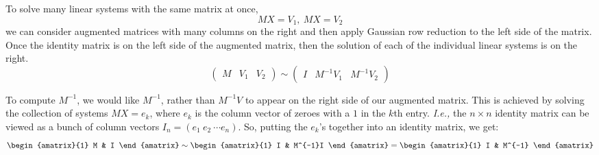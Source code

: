 To solve many linear systems with the same matrix at once, 
$$MX=V_1,~MX=V_2$$
we can consider augmented matrices with 
many columns on the right 
 and then apply Gaussian row reduction to the left side of the matrix.  Once the identity matrix is on the left side of the augmented matrix, then the solution of each of the individual linear systems is on the right.
 \[
\left(\begin{array}{c|cc}
\!M & V_1&V_2\!
\end{array}\right)
\sim
\left(\begin{array}{c|cc}
\!I & M^{-1}V_1 & M^{-1}V_2\!
\end{array}\right)
\]


To compute $M^{-1}$, we would like $M^{-1}$, rather than $M^{-1}V$ to appear on the right side of our augmented matrix.
This is achieved by  solving the collection of systems $MX=e_k$, where $e_k$ is the column vector of zeroes with a $1$ in the $k$th entry.  
{\it I.e.,} the $n\times n$ identity matrix can be viewed as a bunch of column vectors $I_n=(e_1 \ e_2 \ \cdots e_n)$. So, putting the $e_k$'s together into an identity matrix, we get:
\[
\begin{amatrix}{1}
M & I
\end{amatrix}
\sim
\begin{amatrix}{1}
I & M^{-1}I
\end{amatrix}
=\begin{amatrix}{1}
I & M^{-1}
\end{amatrix}
\]


